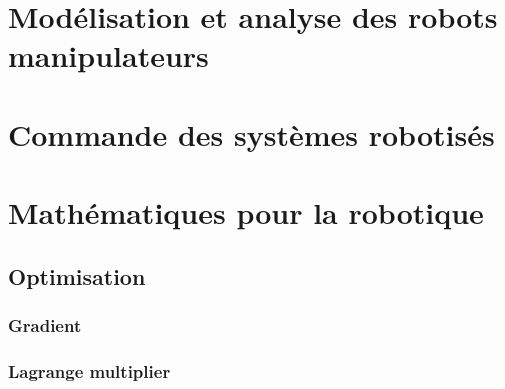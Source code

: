 \documentclass[letterpaper,oneside,french]{book}
\begin{document}


{\hypersetup{linkcolor=black}
\tableofcontents
\newpage
}


\part{Modélisation et analyse des robots manipulateurs}
\label{sec:manip}








\part{Commande des systèmes robotisés}
\label{sec:control}








\part{Mathématiques pour la robotique}



\chapter{Optimisation}
\section{Gradient}
\section{Lagrange multiplier}

\appendix

\end{document}
